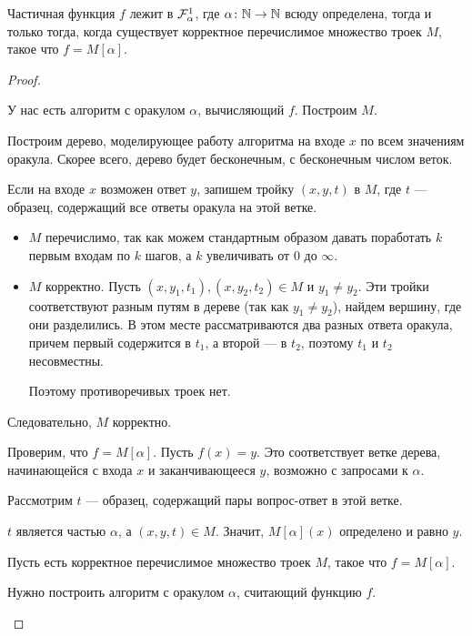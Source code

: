 \begin{thm}\label{thm:malp}
	Частичная функция $ f $ лежит в $\mathcal{F}^{1}_{ \alpha }$, где $ \alpha \colon \mathbb{N} \to  \mathbb{N}$ всюду определена, тогда и только тогда, когда существует корректное перечислимое множество троек $ M$, такое что  $ f = M[ \alpha ]$. 
\end{thm}
\begin{proof}
~\begin{description}
	\item[] У нас есть алгоритм с оракулом $  \alpha $, вычисляющий $ f$. Построим $ M$.

		   Построим  дерево, моделирующее работу алгоритма на входе $ x$ по всем значениям оракула. Скорее всего, дерево будет бесконечным, с бесконечным числом веток.

		   Если на входе $ x$ возможен ответ $ y$, запишем тройку  $ (x, y, t)$ в  $ M$, где  $ t$ --- образец, содержащий все  ответы оракула на этой ветке.
		   \begin{itemize}
			   \item $ M$ перечислимо, так как можем стандартным образом давать поработать $ k$ первым входам по $ k$ шагов, а $ k$ увеличивать от $ 0$ до  $  \infty$.
			   \item $ M$ корректно. Пусть  $ (x, y_1, t_1), (x, y_2, t_2) \in M$ и $  y_1 \ne y_2$. Эти тройки соответствуют разным путям в дереве (так как $  y_1 \ne y_2$), найдем вершину, где они разделились. В этом месте рассматриваются два разных ответа оракула, причем первый содержится в $  t_1$, а второй --- в $  t_2$, поэтому $  t_1$ и $  t_2$ несовместны.

				   Поэтому противоречивых троек нет.
		   \end{itemize}
		   Следовательно, $ M$ корректно.
	   \item Проверим, что $ f = M[ \alpha ]$. Пусть $ f(x) = y$. Это соответствует ветке дерева, начинающейся с входа $ x$ и заканчивающееся   $ y$, возможно с запросами к $  \alpha $.

		   Рассмотрим $ t$ --- образец, содержащий пары вопрос-ответ в этой ветке. 
		   
		   $ t$ является частью  $ \alpha $, а $ (x, y, t) \in M$.
		   Значит, $ M[ \alpha ](x) $ определено и равно $ y$.
	   \item[\boxed{ 2 \Longrightarrow 1}] 
		   Пусть есть корректное перечислимое множество троек $ M$, такое  что $ f = M[ \alpha ]$.

		   Нужно построить алгоритм с оракулом $ \alpha $, считающий функцию $ f$.


\end{description}
\end{proof}
